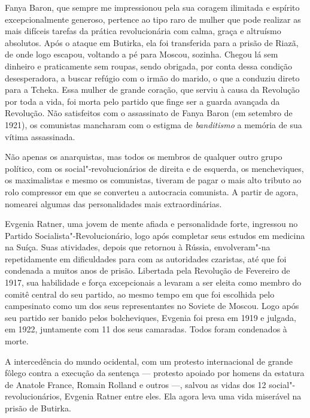 Fanya Baron, que sempre me impressionou pela sua coragem ilimitada e
espírito excepcionalmente generoso, pertence ao tipo raro de mulher que
pode realizar as mais difíceis tarefas da prática revolucionária com
calma, graça e altruísmo absolutos. Após o ataque em Butirka, ela foi
transferida para a prisão de Riazã, de onde logo escapou, voltando a pé
para Moscou, sozinha. Chegou lá sem dinheiro e praticamente
sem roupas, sendo obrigada, por conta dessa condição desesperadora, a
buscar refúgio com o irmão do marido, o que a conduziu direto para a Tcheka.
Essa mulher de grande coração, que serviu à causa da Revolução por toda
a vida, foi morta pelo partido que finge ser a guarda avançada da
Revolução. Não satisfeitos com o assassinato de Fanya Baron (em setembro
de 1921), os comunistas mancharam com o estigma de \textit{banditismo} a
memória de sua vítima assassinada.

Não apenas os anarquistas, mas todos os membros de qualquer outro grupo
político, com os social"-revolucionários de direita e de esquerda, os
mencheviques, os maximalistas e mesmo os comunistas, tiveram de pagar
o mais alto tributo ao rolo compressor em que se converteu a autocracia comunista. A partir de agora, nomearei algumas das personalidades mais extraordinárias.

Evgenia Ratner, uma jovem de mente afiada e personalidade forte,
ingressou no Partido Socialista"-Revolucionário, logo após completar seus
estudos em medicina na Suíça. Suas atividades, depois que retornou à
Rússia, envolveram"-na repetidamente em dificuldades para com as
autoridades czaristas, até que foi condenada a muitos anos de prisão.
Libertada pela Revolução de Fevereiro de 1917, sua habilidade e força
excepcionais a levaram a ser eleita como membro do comitê central do seu
partido, ao mesmo tempo em que foi escolhida pelo campesinato como
um dos seus representantes no Soviete de Moscou. Logo após seu partido
ser banido pelos bolcheviques, Evgenia foi presa em 1919 e julgada, em
1922, juntamente com 11 dos seus camaradas. Todos foram condenados à morte.

A intercedência do mundo ocidental, com um protesto internacional de
grande fôlego contra a execução da sentença --- protesto apoiado por homens da estatura de
Anatole France, Romain Rolland e outros ---, salvou as vidas dos 12
social"-revolucionários, Evgenia Ratner entre eles. Ela agora leva uma
vida miserável na prisão de Butirka.

